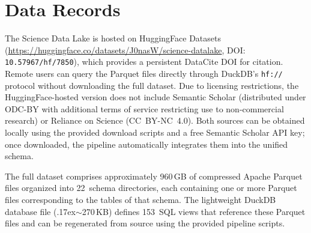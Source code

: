 \section{Data Records}
\label{sec:records}

The Science Data Lake is hosted on HuggingFace Datasets
(\url{https://huggingface.co/datasets/J0nasW/science-datalake},
DOI: \texttt{10.57967/hf/7850}), which provides a persistent
DataCite DOI for citation. Remote users can query the Parquet files directly
through DuckDB's \texttt{hf://} protocol without downloading the full dataset.
Due to licensing restrictions, the HuggingFace-hosted version does not include
Semantic Scholar (distributed under ODC-BY with additional terms of service
restricting use to non-commercial research) or Reliance on Science
(CC~BY-NC~4.0). Both sources can be obtained locally using the provided download
scripts and a free Semantic Scholar API key; once downloaded, the pipeline
automatically integrates them into the unified schema.

The full dataset comprises approximately 960\,GB of compressed Apache Parquet
files organized into 22~schema directories, each containing one or more Parquet
files corresponding to the tables of that schema. The lightweight DuckDB database
file ({\raise.17ex\hbox{$\scriptstyle\sim$}}270\,KB) defines 153~SQL views that
reference these Parquet files and can be regenerated from source using the
provided pipeline scripts.

